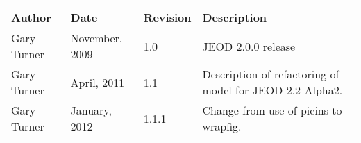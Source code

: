 %
%
%



\begin{tabular}{||l|l|l|l|} \hline
 {\bf Author} & {\bf Date} &  {\bf Revision} & {\bf Description} \\ \hline \hline
 Gary Turner & November, 2009 & 1.0  & JEOD 2.0.0 release \\ \hline
 Gary Turner & April, 2011    & 1.1  & Description of refactoring of model for JEOD 2.2-Alpha2. \\ \hline
 Gary Turner & January, 2012    & 1.1.1  & Change from use of picins to wrapfig.\\ \hline
\end{tabular}

